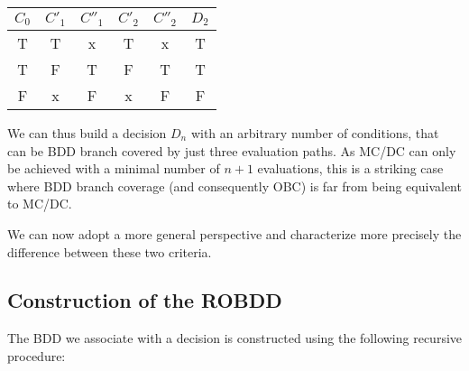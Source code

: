\documentclass[a4paper,12pt,twoside]{article}
\begin{document}
\begin{center}
\begin{tabular}{|c|c|c|c|c||c|}
\hline
$C_{0}$   & $C'_{1}$   & $C''_{1}$   & $C'_{2}$   & $C''_{2}$   & $D_{2}$ \\ \hline
T      & T       & x        & T       & x        & T     \\ \hline
T      & F       & T        & F       & T        & T     \\ \hline
F      & x       & F        & x       & F        & F     \\ \hline
\end{tabular}
\end{center}

We can thus build a decision $D_{n}$ with an arbitrary number of conditions,
that can be BDD branch covered by just three evaluation paths. As MC/DC can
only be achieved with a minimal number of $n+1$ evaluations, this is a
striking case where BDD branch coverage (and consequently OBC) is far from
being equivalent to MC/DC.

We can now adopt a more general perspective and characterize more
precisely the difference between these two criteria.

\subsection{Construction of the ROBDD}

The BDD we associate with a decision is constructed using the following
recursive procedure:
\end{document}
